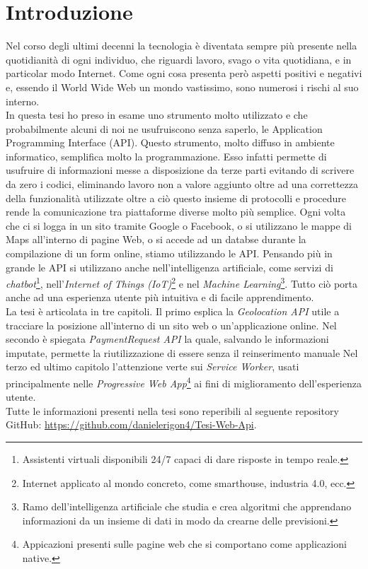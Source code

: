\documentclass[12pt ,a4paper , twoside , openright ]{book}
\begin{document}
	\chapter{Introduzione}
	Nel corso degli ultimi decenni la tecnologia è diventata sempre più presente nella quotidianità di ogni individuo, che riguardi lavoro, svago o vita quotidiana, e in particolar modo Internet. Come ogni cosa presenta però aspetti positivi e negativi e, essendo il World Wide Web un mondo vastissimo, sono numerosi i rischi al suo interno. \\ 
	In questa tesi ho preso in esame uno strumento molto utilizzato e che probabilmente alcuni di noi ne usufruiscono senza saperlo, le Application Programming Interface (API). Questo strumento, molto diffuso in ambiente informatico, semplifica molto la programmazione. Esso infatti permette di usufruire di informazioni messe a disposizione da terze parti evitando di scrivere da zero i codici, eliminando lavoro non a valore aggiunto oltre ad una correttezza della funzionalità utilizzate oltre a ciò questo insieme di protocolli e procedure rende la comunicazione tra piattaforme diverse molto più semplice. Ogni volta che ci si logga in un sito tramite Google o Facebook, o si utilizzano le mappe di Maps all'interno di pagine Web, o si accede ad un databse durante la compilazione di un form online, stiamo utilizzando le API. Pensando più in grande le API si utilizzano anche nell'intelligenza artificiale, come servizi di \textit{chatbot}\footnote{Assistenti virtuali disponibili 24/7 capaci di dare risposte in tempo reale.}, nell'\textit{Internet of Things (IoT)}\footnote{Internet applicato al mondo concreto, come smarthouse, industria 4.0, ecc.} e nel \textit{Machine Learning}\footnote{Ramo dell'intelligenza artificiale che studia e crea algoritmi che apprendano informazioni da un insieme di dati in modo da crearne delle previsioni.}. Tutto ciò porta anche ad una esperienza utente più intuitiva e di facile apprendimento. \\
	La tesi è articolata in tre capitoli. Il primo esplica la \textit{Geolocation API}\cite{rif2} utile a tracciare la posizione all'interno di un sito web o un'applicazione online. Nel secondo è spiegata \textit{PaymentRequest API}\cite{rif1} la quale, salvando le informazioni imputate, permette la riutilizzazione di essere senza il reinserimento manuale Nel terzo ed ultimo capitolo l'attenzione verte sui \textit{Service Worker}\cite{rif5}, usati principalmente nelle \textit{Progressive Web App}\footnote{Appicazioni presenti sulle pagine web che si comportano come applicazioni native.} ai fini di miglioramento dell'esperienza utente.
	\\
	Tutte le informazioni presenti nella tesi sono reperibili al seguente repository GitHub: \url{https://github.com/danielerigon4/Tesi-Web-Api}.
	\cleardoublepage
	
\end{document}
